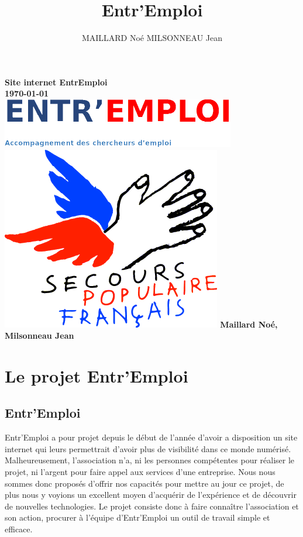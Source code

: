 \documentclass[a4paper, 12pt]{report}
\title{Entr'Emploi}
\author{MAILLARD Noé MILSONNEAU Jean}
\begin{document}
\begin{titlepage}
	\thispagestyle{empty}
    \centering
    {\bfseries\Large
    		Site internet EntrEmploi\\
        \today\\
        \vskip3cm
        \includegraphics{../../public/images/Logo-entremploi-md.png}
        \vskip15mm
        \includegraphics{../../public/images/Logo-spf.png}
        \vskip3cm
        Maillard Noé, Milsonneau Jean\\
    }
    \normalsize
\end{titlepage}

\tableofcontents
\chapter{Le projet Entr'Emploi}
\thispagestyle{fancy}
\section{Entr'Emploi}
Entr'Emploi a pour projet depuis le début de l'année d'avoir a disposition un site internet qui leurs permettrait d'avoir plus de visibilité
dans ce monde numérisé. Malheureusement, l'association n'a, ni les personnes compétentes pour réaliser le projet, ni l'argent pour faire appel aux services d'une entreprise.
Nous nous sommes donc proposés d’offrir nos capacités pour mettre au jour ce projet, de plus nous y voyions un excellent moyen d’acquérir de l'expérience et de découvrir de nouvelles technologies.
Le projet consiste donc à faire connaître l'association et son action, procurer à l'équipe d'Entr'Emploi un outil de travail simple et efficace.
\end{document}
